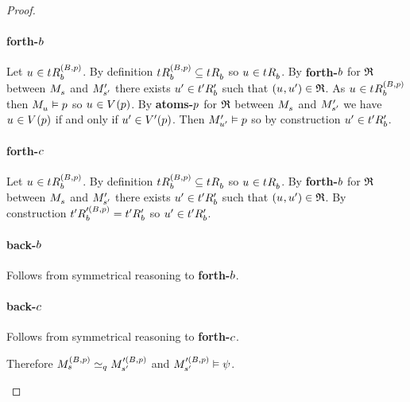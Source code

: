 \begin{proof}
\begin{description}
        \paragraph{forth-$\agentB$}
        Let $\kStateU \in \kSuccessorsB[(\agentsB, \atomP)]{\kStateT}$.
        By definition $\kSuccessorsB[(\agentsB, \atomP)]{\kStateT} \subseteq \kSuccessorsB{\kStateT}$ so $\kStateU \in \kSuccessorsB{\kStateT}$.
        By {\bf forth-$\agentB$} for $\bisimulation$ between $\kPModel{\kStateS}$ and $\kPModelP{\kStateSP}$ there exists $\kStateUP \in \kSuccessorsPB{\kStateTP}$ such that $(\kStateU, \kStateUP) \in \bisimulation$.
        As $\kStateU \in \kSuccessorsB[(\agentsB, \atomP)]{\kStateT}$ then $\kPModel{\kStateU} \entails \atomP$ so $\kStateU \in \kValuation(\atomP)$.
        By {\bf atoms-$\atomP$} for $\bisimulation$ between $\kPModel{\kStateS}$ and $\kPModelP{\kStateSP}$ we have $\kStateU \in \kValuation(\atomP)$ if and only if $\kStateUP \in \kValuationP(\atomP)$.
        Then $\kPModelP{\kStateUP} \entails \atomP$ so by construction $\kStateUP \in \kSuccessorsPB{\kStateTP}$.

        \paragraph{forth-$\agentC$}
        Let $\kStateU \in \kSuccessorsB[(\agentsB, \atomP)]{\kStateT}$.
        By definition $\kSuccessorsB[(\agentsB, \atomP)]{\kStateT} \subseteq \kSuccessorsB{\kStateT}$ so $\kStateU \in \kSuccessorsB{\kStateT}$.
        By {\bf forth-$\agentB$} for $\bisimulation$ between $\kPModel{\kStateS}$ and $\kPModelP{\kStateSP}$ there exists $\kStateUP \in \kSuccessorsPB{\kStateTP}$ such that $(\kStateU, \kStateUP) \in \bisimulation$.
        By construction $\kSuccessorsB[\prime(\agentsB, \atomP)]{\kStateTP} = \kSuccessorsPB{\kStateTP}$ so $\kStateUP \in \kSuccessorsPB{\kStateTP}$.

        \paragraph{back-$\agentB$}
        Follows from symmetrical reasoning to {\bf forth-$\agentB$}.

        \paragraph{back-$\agentC$}
        Follows from symmetrical reasoning to {\bf forth-$\agentC$}.

        Therefore $\kPModel[(\agentsB, \atomP)]{\kStateS} \bisimilar[\atomQ] \kPModel[\prime(\agentsB, \atomP)]{\kStateSP}$ and $\kPModel[\prime(\agentsB, \atomP)]{\kStateSP} \entails \psi$.


\end{description}
\end{proof}
